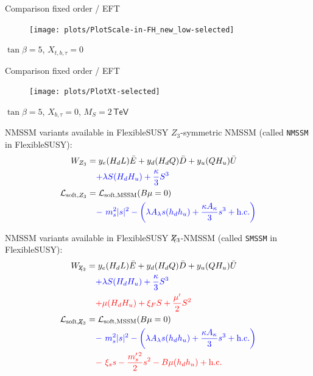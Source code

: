 \documentclass[hyperref={pdfpagelabels=false},ngerman]{beamer}
\newcommand{\eh}[1]{\,\mathsf{#1}}
\newcommand{\Lagr}{\mathcal{L}}
\newcommand{\Zv}{\ensuremath{\backslash\mkern-11.0mu{Z_3}}}
\begin{document}

\begin{frame}{Comparison fixed order / EFT}
  \begin{figure}
    \centering
    \texttt{[image: plots/PlotScale-in-FH\_new\_low-selected]}
  \end{figure}
  $\tan\beta = 5$, $X_{t,b,\tau} = 0$
\end{frame}


\begin{frame}{Comparison fixed order / EFT}
  \begin{figure}
    \centering
    \texttt{[image: plots/PlotXt-selected]}
  \end{figure}
  $\tan\beta = 5$, $X_{b,\tau} = 0$, $M_S = 2\eh{TeV}$
\end{frame}


\begin{frame}{NMSSM variants available in FlexibleSUSY}
  $Z_3$-symmetric NMSSM (called \texttt{NMSSM} in FlexibleSUSY):
  \begin{align*} 
    W_{Z_3} &= y_e (H_d L) \bar{E}
      + y_d (H_d Q) \bar{D}
      + y_u (Q H_u) \bar{U}\\
      &\phantom{={}}
      \textcolor{blue}{+ \lambda S (H_d H_u) + \frac{\kappa}{3}S^{3}} \\
    \Lagr_{\text{soft},Z_3} &= \Lagr_\text{soft,MSSM}(B\mu=0)\\
    &\phantom{={}}
    \textcolor{blue}{ -\ m_s^2|s|^2 
      -\left(\lambda A_\lambda s (h_d h_u)
        + \frac{\kappa A_\kappa}{3} s^3 + \text{h.c.}\right)}
  \end{align*}
\end{frame}

\begin{frame}{NMSSM variants available in FlexibleSUSY}
  $\Zv$-NMSSM (called \texttt{SMSSM} in FlexibleSUSY):
  \begin{align*} 
    W_{\Zv} &= y_e (H_d L) \bar{E}
      + y_d (H_d Q) \bar{D}
      + y_u (Q H_u) \bar{U}\\
      &\phantom{={}}
      \textcolor{blue}{+ \lambda S (H_d H_u) + \frac{\kappa}{3}S^{3}} \\
      &\phantom{={}}
      \textcolor{red}{+ \mu(H_d H_u) + \xi_FS 
      + \frac{\mu^\prime}{2} S^{2}}\\
    \Lagr_{\text{soft},\Zv} &= \Lagr_\text{soft,MSSM}(B\mu=0)\\
    &\phantom{={}}
    \textcolor{blue}{ -\ m_s^2|s|^2 
      -\left(\lambda A_\lambda s (h_d h_u)
        + \frac{\kappa A_\kappa}{3} s^3 + \text{h.c.}\right)}\\
    &\phantom{={}}
    \textcolor{red}{ -\ \xi_s s - \frac{m_s^{\prime \, 2}}{2} s^2
    - B\mu (h_d h_u) + \text{h.c.}}
  \end{align*}
\end{frame}
\end{document}
